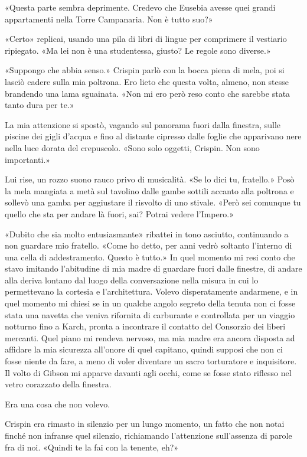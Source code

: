 «Questa parte sembra deprimente. Credevo che Eusebia avesse quei grandi
appartamenti nella Torre Campanaria. Non è tutto suo?»

«Certo» replicai, usando una pila di libri di lingue per comprimere il
vestiario ripiegato. «Ma lei non è una studentessa, giusto? Le regole
sono diverse.»

«Suppongo che abbia senso.» Crispin parlò con la bocca piena di mela,
poi si lasciò cadere sulla mia poltrona. Ero lieto che questa volta,
almeno, non stesse brandendo una lama sguainata. «Non mi ero però reso
conto che sarebbe stata tanto dura per te.»

La mia attenzione si spostò, vagando sul panorama fuori dalla finestra,
sulle piscine dei gigli d'acqua e fino al distante cipresso dalle foglie
che apparivano nere nella luce dorata del crepuscolo. «Sono solo
oggetti, Crispin. Non sono importanti.»

Lui rise, un rozzo suono rauco privo di musicalità. «Se lo dici tu,
fratello.» Posò la mela mangiata a metà sul tavolino dalle gambe sottili
accanto alla poltrona e sollevò una gamba per aggiustare il risvolto di
uno stivale. «Però sei comunque tu quello che sta per andare là fuori,
sai? Potrai vedere l'Impero.»

«Dubito che sia molto entusiasmante» ribattei in tono asciutto,
continuando a non guardare mio fratello. «Come ho detto, per anni vedrò
soltanto l'interno di una cella di addestramento. Questo è tutto.» In
quel momento mi resi conto che stavo imitando l'abitudine di mia madre
di guardare fuori dalle finestre, di andare alla deriva lontano dal
luogo della conversazione nella misura in cui lo permettevano la
cortesia e l'architettura. Volevo disperatamente andarmene, e in quel
momento mi chiesi se in un qualche angolo segreto della tenuta non ci
fosse stata una navetta che veniva {rifornita} di carburante e
controllata per un viaggio notturno fino a Karch, pronta a incontrare il
contatto del Consorzio dei liberi mercanti. Quel piano mi rendeva
nervoso, ma mia madre era ancora disposta ad affidare la mia sicurezza
all'onore di quel capitano, quindi supposi che non ci fosse niente da
fare, a meno di voler diventare un sacro torturatore e inquisitore. Il
volto di Gibson mi apparve davanti agli occhi, come se fosse stato
riflesso nel vetro corazzato della finestra.

Era una cosa che non volevo.

Crispin era rimasto in silenzio per un lungo momento, un fatto che non
notai finché non infranse quel silenzio, richiamando l'attenzione
sull'assenza di parole fra di noi. «Quindi te la fai con la tenente,
eh?»

